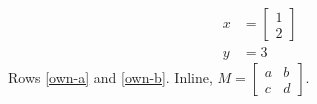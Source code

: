 \documentclass{article}
\renewcommand{\bmatrix}[1]{\left[\begin{matrix}#1\end{matrix}\right]}
\begin{document}
\begin{align}
x &= \bmatrix{1 \\ 2} \label{own-a} \\
y &= 3 \label{own-b}
\end{align}
Rows \eqref{own-a} and \eqref{own-b}. Inline, $M = \bmatrix{a & b \\ c & d}$.
\end{document}
